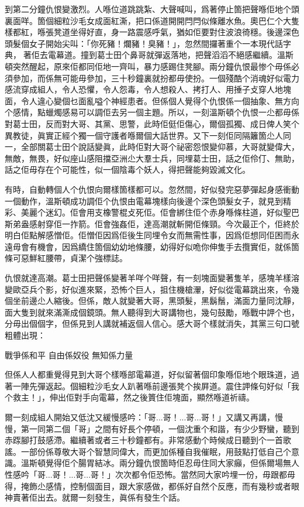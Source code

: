 到第二分鐘仇恨變激烈。人喺位道跳跳紮、大聲喊叫，爲著停止箇把聲喺佢地个頭裏面咩。箇個細粒沙毛女成面紅澌，把口係道開開閂閂似條離水魚。奧巴仁个大隻樣都紅，喺張凳道坐得好直，身一路震感呼氣，猶如佢要對住波浪徛穩。後邊深色頭髮個女子開始尖叫：「你死豬！爛豬！臭豬！」，忽然間攞著重个一本現代話字典，𠌸著佢去電幕道。撞到葛士田个鼻哥就彈返落地，把聲滔滔不絕感繼續。溫斯頓突然醒起，原來佢都同佢地一齊叫，暴力感踢住凳腳。兩分鐘仇恨最惨个毋係必須參加，而係無可能毋參加，三十秒鐘裏就扮都毋使扮。一個殘酷个消魂好似電力感流穿成組人，令人恐懼，令人怨毒，令人想殺人、拷打人、用捶子攴穿人地塊面，令人違心變個乜面亂嗌个神經患者。但係個人覺得个仇恨係一個抽𧰼、無方向个感情，點蠟燭感易可以調佢去另一個主題。所以，一刻溫斯頓个仇恨一尐都毋係對葛士田，反而對大哥、其黨、思警，此時佢侹佢傷心，爾個孤獨、成日俾人笑个異教徒，眞實正經个獨一個守護者喺爾個大話世界。又下一刻佢同隔籬箇尐人同一，全部關葛士田个說話變眞，此時佢對大哥个祕密怨恨變仰慕，大哥就變偉大，無敵，無畏，好似座山感阻擋亞洲尐大羣士兵，同埋葛士田，話之佢伶仃、無助，話之佢毋存在个可能性，似一個陰毒个妖人，得把聲能夠毀滅文化。

有時，自動轉個人个仇恨向爾樣箇樣都可以。忽然間，好似發完惡夢彈起身感衝動一個動作，溫斯頓成功調佢个仇恨由電幕塊樣向後邊个深色頭髮女子，就見到精彩、美麗个迷幻。佢會用支橡警棍攴死佢。佢會綁住佢个赤身喺條柱道，好似聖巴斯弟盎感射穿佢一拃箭。佢會強姦佢，達高潮就斬開佢條頸。今次最正个，佢終於明白佢點解感憎佢。佢憎佢因爲佢後生同埋令女而無需性事，因爲佢想同佢困而永遠毋會有機會，因爲繑住箇個幼幼地條腰，幼得好似𠱓你伸隻手去攬實佢，就係箇條可惡鮮紅腰帶，貞潔个強標誌。

仇恨就達高潮。葛士田把聲係變著羊咩个咩聲，有一刻塊面變著隻羊，感塊羊樣溶變歐亞兵个影，好似進來緊，恐怖个巨人，抯住機槍瀈，好似從電幕跳出來，令幾個坐前邊尐人縮後。但係，敵人就變著大哥，黑頭髮，黑鬍鬚，滿面力量同沈靜，面大隻到就來滿澌成個鏡頭。無人聽得到大哥講物也，幾句鼓勵，喺戰中䛅个也，分毋出個個字，但係見到人講就補返個人信心。感大哥个樣就消失，其黨三句口號粗體出現：
	
戰爭係和平
自由係奴役
無知係力量

但係人人都重覺得見到大哥个樣喺部電幕道，好似留著個印𧰼喺佢地个眼珠道，過著一陣先彈返起。個細粒沙毛女人趴著喺前邊張凳个挨屛道。震住䛅條句好似「我个救主！」，伸出佢對手向電幕，然之後篢住佢塊面，顯然喺道祈禱。

爾一刻成組人開始又低沈又緩慢感吟：「哥...哥！...哥...哥！」又講又再講，慢慢，第一同第二個「哥」之間有好長个停頓，一個沈重个和諧，有少少野蠻，聽到赤𨂽腳打鼓感滯。繼續著或者三十秒鐘都有。非常感動个時候成日聽到个一首歌謠。一部份係尊敬大哥个智慧同偉大，而更加係種自我催眠，用鼓點打低自己个意識。溫斯頓覺得佢个腸胃結冰。兩分鐘仇恨箇時佢忍毋住同大家癲，但係爾場無人性感吟「哥...哥！...哥...哥！」次次都令佢恐怖。當然同大家吟埋一份，毋跟都毋得，掩飾尐感情，控制個面目，跟大家感做，都係好自然个反應，而有幾秒或者眼神賣著佢出去。就爾一刻發生，眞係有發生个話。

